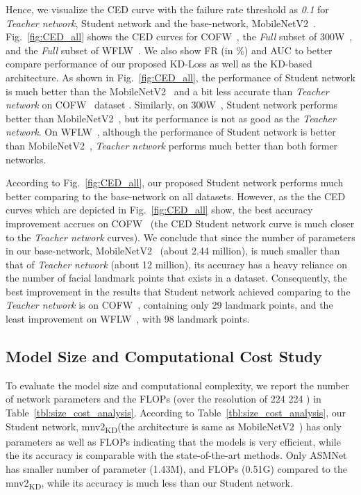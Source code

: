 \documentclass[times,twocolumn,final,authoryear]{elsarticle}
\begin{document}
Hence, we visualize the CED curve with the failure rate threshold as \textit{0.1} for \textit{Teacher network}, Student network and the base-network, MobileNetV2~\cite{sandler2018MobileNetV2}. Fig.~\ref{fig:CED_all} shows the CED curves for COFW~\cite{burgos2013robust}, the \textit{Full} subset of 300W~\cite{sagonas2013300}, and the \textit{Full} subset of WFLW~\cite{wu2018look}. We also show FR (in \%) and AUC to better compare performance of our proposed KD-Loss as well as the KD-based architecture. As shown in Fig.~\ref{fig:CED_all}, the performance of Student network is much better than the MobileNetV2~\cite{sandler2018MobileNetV2} and a bit less accurate than \textit{Teacher network} on COFW~\cite{burgos2013robust} dataset . Similarly, on 300W~\cite{sagonas2013300}, Student network performs better than MobileNetV2~\cite{sandler2018MobileNetV2}, but its performance is not as good as the \textit{Teacher network}. On WFLW~\cite{wu2018look}, although the performance of Student network is better than MobileNetV2~\cite{sandler2018MobileNetV2}, \textit{Teacher network} performs much better than both former networks.

According to Fig.~\ref{fig:CED_all}, our proposed Student network performs much better comparing to the base-network on all datasets. However, as the the CED curves which are depicted in Fig.~\ref{fig:CED_all} show, the best accuracy improvement accrues on COFW~\cite{burgos2013robust} (the CED Student network curve is much closer to the \textit{Teacher network} curves). We conclude that since the number of parameters in our base-network, MobileNetV2~\cite{sandler2018MobileNetV2} (about 2.44 million), is much smaller than that of \textit{Teacher network} (about 12 million), its accuracy has a heavy reliance on the number of facial landmark points that exists in a dataset. Consequently, the best improvement in the results that Student network achieved comparing to the \textit{Teacher network} is on COFW~\cite{burgos2013robust}, containing only 29 landmark points, and the least improvement on WFLW~\cite{wu2018look}, with 98 landmark points.




\subsection{Model Size and Computational Cost Study}
To evaluate the model size and computational complexity, we report the number of network parameters and the FLOPs (over the resolution of 224  224 ) in Table~\ref{tbl:size_cost_analysis}. According to Table~\ref{tbl:size_cost_analysis}, our Student network, mnv2\textsubscript{KD}(the architecture is same as MobileNetV2~\cite{sandler2018MobileNetV2}) has only  parameters as well as  FLOPs indicating that the models is very efficient, while the its accuracy is comparable with the state-of-the-art methods. Only ASMNet~\cite{fard2021asmnet} has smaller number of parameter (1.43M), and FLOPs (0.51G) compared to the mnv2\textsubscript{KD}, while its accuracy is much less than our Student network. 
\end{document}
